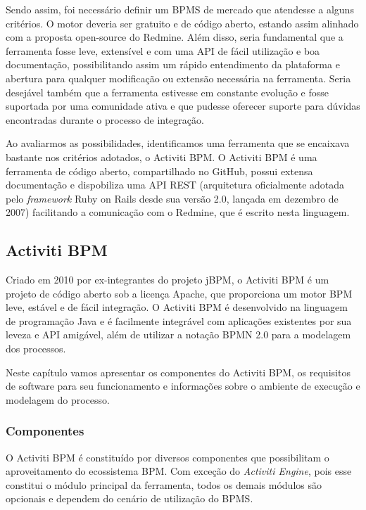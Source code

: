 Sendo assim, foi necessário definir um BPMS de mercado que atendesse a alguns critérios. O motor deveria ser gratuito e de código aberto, estando assim alinhado com a proposta open-source do Redmine. Além disso, seria fundamental que a ferramenta fosse leve, extensível e com uma API de fácil utilização e boa documentação, possibilitando assim um rápido entendimento da plataforma e abertura para qualquer modificação ou extensão necessária na ferramenta. Seria desejável também que a ferramenta estivesse em constante evolução e fosse suportada por uma comunidade ativa e que pudesse oferecer suporte para dúvidas encontradas durante o processo de integração.

Ao avaliarmos as possibilidades, identificamos uma ferramenta que se encaixava bastante nos critérios adotados, o Activiti BPM. O Activiti BPM é uma ferramenta de código aberto, compartilhado no GitHub\cite{activiti_github}, possui extensa documentação\cite{activiti-userguide} e dispobiliza uma API REST (arquitetura oficialmente adotada pelo \textit{framework} Ruby on Rails desde sua versão 2.0, lançada em dezembro de 2007\cite{rails_rest_support}) facilitando a comunicação com o Redmine, que é escrito nesta linguagem. 

\subsection{Activiti BPM}\label{sec:activiti}
Criado em 2010 por ex-integrantes do projeto jBPM\cite{bpm_jbpm}, o Activiti BPM\cite{bpm_activiti} é um projeto de código aberto sob a licença Apache\cite{apache_license}, que proporciona um motor BPM leve, estável e de fácil integração. O Activiti BPM é desenvolvido na linguagem de programação Java\cite{java-history} e é facilmente integrável com aplicações existentes por sua leveza e API\cite{api} amigável, além de utilizar a notação BPMN 2.0 para a modelagem dos processos.

Neste capítulo vamos apresentar os componentes do Activiti BPM, os requisitos de software para seu funcionamento e informações sobre o ambiente de execução e modelagem do processo.

\subsubsection{Componentes}\label{sec:automatizacao_processos-gestao_processos}

O Activiti BPM é constituído por diversos componentes que possibilitam o aproveitamento do ecossistema BPM. Com exceção do \textit{Activiti Engine}, pois esse constitui o módulo principal da ferramenta, todos os demais módulos são opcionais e dependem do cenário de utilização do BPMS.

